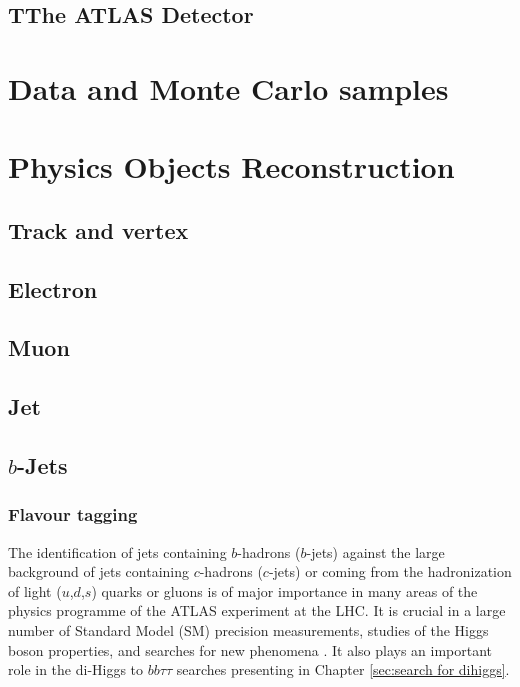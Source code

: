 \documentclass[letterpaper,12pt]{article}
\begin{document}
\subsection{TThe ATLAS Detector}
\section{Data and Monte Carlo samples}
\section{Physics Objects Reconstruction}
\subsection{Track and vertex}
\subsection{Electron}
\subsection{Muon}
\subsection{Jet}
\subsection{$b$-Jets}


\subsubsection{Flavour tagging}


The identification of jets containing $b$-hadrons ($b$-jets) 
against the large background of jets containing $c$-hadrons 
($c$-jets) or coming from the hadronization of light ($u$,$d$,$s$) 
quarks or gluons is of major importance in many areas of the 
physics programme of the ATLAS experiment at the LHC. 
It is crucial in a large number of Standard Model (SM) 
precision measurements, studies of the Higgs boson properties, and 
searches for new phenomena \cite{SUSY-2014-08, ATLAS-CONF-2018-043,Interpreting_Higgs_result}.
It also plays an important role in 
the di-Higgs to $bb\tau\tau$ searches presenting in Chapter \ref{sec:search for dihiggs}. 
\end{document}
